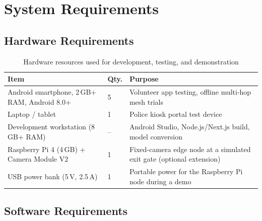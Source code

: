 \documentclass[12pt,a4paper,oneside]{report}
\begin{document}
\section{System Requirements}

\subsection{Hardware Requirements}

\begin{table}[H]
\centering
\caption{Hardware resources used for development, testing, and demonstration}
\begin{tabular}{|p{4.2cm}|p{2.0cm}|p{7.5cm}|}
\hline
\textbf{Item} & \textbf{Qty.} & \textbf{Purpose} \\
\hline
Android smartphone, 2\,GB+ RAM, Android 8.0+ & 5 & Volunteer app testing, offline multi-hop mesh trials \\ \hline
Laptop / tablet & 1 & Police kiosk portal test device \\ \hline
Development workstation (8\,GB+ RAM) & -- & Android Studio, Node.js/Next.js build, model conversion \\ \hline
Raspberry Pi 4 (4\,GB) + Camera Module V2 & 1 & Fixed-camera edge node at a simulated exit gate (optional extension) \\ \hline
USB power bank (5\,V, 2.5\,A) & 1 & Portable power for the Raspberry Pi node during a demo \\
\hline
\end{tabular}
\end{table}

\subsection{Software Requirements}
\end{document}
